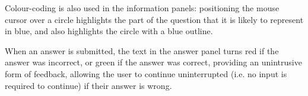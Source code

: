 \documentclass[12pt,twoside,notitlepage,xetex]{report}
\begin{document}
Colour-coding is also used in the information panels: positioning the mouse cursor over a circle highlights the part of the question that it is likely to represent in blue, and also highlights the circle with a blue outline.

When an answer is submitted, the text in the answer panel turns red if the answer was incorrect, or green if the answer was correct, providing an unintrusive form of feedback, allowing the user to continue uninterrupted (i.e. no input is required to continue) if their answer is wrong.

\begin{center}
\begin{figure}[H]
\begin{center}
\hspace{2cm}
\\
\end{center}
\end{figure}
\end{center}
\end{document}
